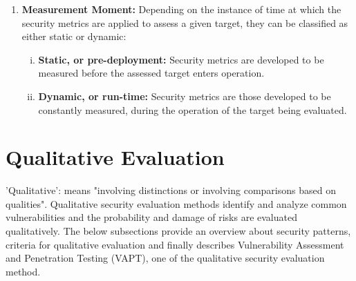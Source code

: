 \documentclass[pdftex,english,oribibl]{llncs}
\begin{document}
\begin{enumerate}[(1)]
	\item {\textbf{Measurement Moment:} Depending on the instance of time at which the security metrics are applied to assess a given target, they can be classified as either static or dynamic:}
	\begin{enumerate}[(i)]
	\item {\textbf{Static, or pre-deployment:} Security metrics are developed to be measured before the assessed target enters operation.}
	\item {\textbf{Dynamic, or run-time:} Security metrics are those developed to be constantly measured, during the operation of the target being evaluated.}
	\end{enumerate}

\end{enumerate}
	
\section{Qualitative Evaluation}\label{sec:qualitative}
'Qualitative': means "involving distinctions or involving comparisons based on qualities". Qualitative security evaluation methods identify and analyze common vulnerabilities and the probability and damage of risks are evaluated qualitatively. The below subsections provide an overview about security patterns, criteria for qualitative evaluation and finally describes Vulnerability Assessment and Penetration Testing (VAPT), one of the qualitative security evaluation method.
\end{document}
